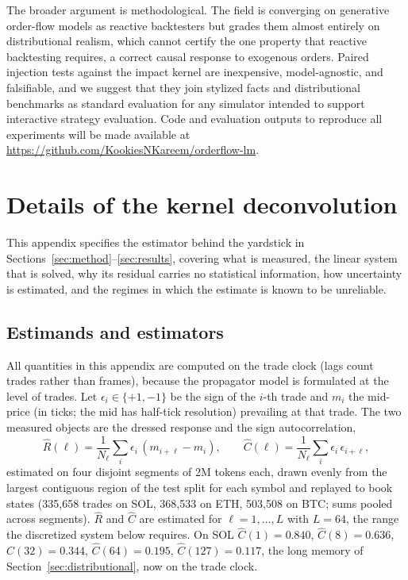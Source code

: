 \documentclass[11pt]{article}
\begin{document}
The broader argument is methodological. The field is converging on generative order-flow models as reactive backtesters but grades them almost entirely on distributional realism, which cannot certify the one property that reactive backtesting requires, a correct causal response to exogenous orders. Paired injection tests against the impact kernel are inexpensive, model-agnostic, and falsifiable, and we suggest that they join stylized facts and distributional benchmarks as standard evaluation for any simulator intended to support interactive strategy evaluation. Code and evaluation outputs to reproduce all experiments will be made available at \url{https://github.com/KookiesNKareem/orderflow-lm}.




\appendix

\section{Details of the kernel deconvolution}
\label{app:deconv}

This appendix specifies the estimator behind the yardstick in Sections~\ref{sec:method}--\ref{sec:results}, covering what is measured, the linear system that is solved, why its residual carries no statistical information, how uncertainty is estimated, and the regimes in which the estimate is known to be unreliable.

\subsection{Estimands and estimators}

All quantities in this appendix are computed on the trade clock (lags count trades rather than frames), because the propagator model is formulated at the level of trades. Let $\epsilon_i \in \{+1,-1\}$ be the sign of the $i$-th trade and $m_i$ the mid-price (in ticks; the mid has half-tick resolution) prevailing at that trade. The two measured objects are the dressed response and the sign autocorrelation,
\[
\hat{R}(\ell) = \frac{1}{N_\ell}\sum_i \epsilon_i\,(m_{i+\ell}-m_i),
\qquad
\hat{C}(\ell) = \frac{1}{N_\ell}\sum_i \epsilon_i\,\epsilon_{i+\ell},
\]
estimated on four disjoint segments of 2M tokens each, drawn evenly from the largest contiguous region of the test split for each symbol and replayed to book states (335{,}658 trades on SOL, 368{,}533 on ETH, 503{,}508 on BTC; sums pooled across segments). $\hat{R}$ and $\hat{C}$ are estimated for $\ell = 1,\dots,L$ with $L=64$, the range the discretized system below requires. On SOL $\hat{C}(1)=0.840$, $\hat{C}(8)=0.636$, $\hat{C}(32)=0.344$, $\hat{C}(64)=0.195$, $\hat{C}(127)=0.117$, the long memory of Section~\ref{sec:distributional}, now on the trade clock.
\end{document}
